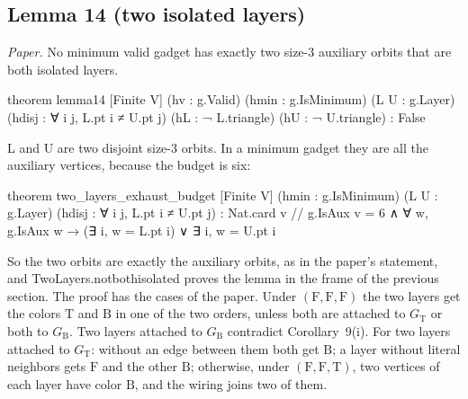\documentclass[11pt,a4paper]{article}
\newcommand{\leanus}{\textunderscore\allowbreak}
\newcommand{\lean}[1]{{\ttfamily\let\_\leanus #1}}
\newcommand{\GT}{G_{\mathrm{T}}}
\newcommand{\GB}{G_{\mathrm{B}}}
\newcommand{\T}{\mathrm{T}}
\newcommand{\F}{\mathrm{F}}
\newcommand{\B}{\mathrm{B}}
\begin{document}
\subsection{Lemma 14 (two isolated layers)}
\emph{Paper.} No minimum valid gadget has exactly two size-3 auxiliary
orbits that are both isolated layers.
\begin{code}
theorem lemma14 [Finite V] (hv : g.Valid) (hmin : g.IsMinimum) (L U : g.Layer)
    (hdisj : ∀ i j, L.pt i ≠ U.pt j) (hL : ¬ L.triangle) (hU : ¬ U.triangle) : False
\end{code}
\lean{L} and \lean{U} are two disjoint size-3 orbits. In a minimum gadget
they are all the auxiliary vertices, because the budget is six:
\begin{code}
theorem two_layers_exhaust_budget [Finite V] (hmin : g.IsMinimum) (L U : g.Layer)
    (hdisj : ∀ i j, L.pt i ≠ U.pt j) :
    Nat.card {v // g.IsAux v} = 6 ∧
      ∀ w, g.IsAux w → (∃ i, w = L.pt i) ∨ ∃ i, w = U.pt i
\end{code}
So the two orbits are exactly the auxiliary orbits, as in the paper's
statement, and \lean{TwoLayers.not\_both\_isolated} proves the lemma in the
frame of the previous section. The proof has the cases of the paper. Under $(\F,\F,\F)$ the two layers get
the colors $\T$ and $\B$ in one of the two orders, unless both are attached
to $\GT$ or both to $\GB$. Two layers attached to $\GB$ contradict
Corollary~9(i). For two layers attached to $\GT$: without an edge between
them both get $\B$; a layer without literal neighbors gets $\F$ and the
other $\B$; otherwise, under $(\F,\F,\T)$, two vertices of each layer have
color $\B$, and the wiring joins two of them.
\end{document}
